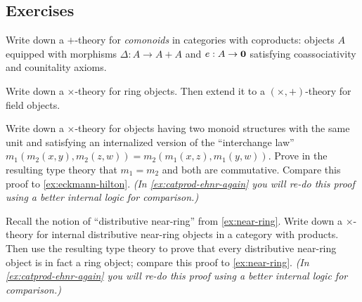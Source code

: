 \subsection*{Exercises}

\begin{ex}\label{ex:catcoprod-comon}
  Write down a $+$-theory for \emph{comonoids} in categories with coproducts: objects $A$ equipped with morphisms $\Delta:A\to A+A$ and $e:A\to \mathbf{0}$ satisfying coassociativity and counitality axioms.
\end{ex}

\begin{ex}\label{ex:catprodcoprod-field}
  Write down a $\times$-theory for ring objects.
  Then extend it to a $(\times,+)$-theory for field objects.
\end{ex}

\begin{ex}\label{ex:catprod-eckmann-hilton}
  Write down a $\times$-theory for objects having two monoid structures with the same unit and satisfying an internalized version of the ``interchange law'' $m_1(m_2(x,y),m_2(z,w)) = m_2(m_1(x,z),m_1(y,w))$.
  Prove in the resulting type theory that $m_1=m_2$ and both are commutative.
  Compare this proof to \cref{ex:eckmann-hilton}.
  \textit{(In \cref{ex:catprod-ehnr-again} you will re-do this proof using a better internal logic for comparison.)}
\end{ex}

\begin{ex}\label{ex:catprod-nearring}
  Recall the notion of ``distributive near-ring'' from \cref{ex:near-ring}.
  Write down a $\times$-theory for internal distributive near-ring objects in a category with products.
  Then use the resulting type theory to prove that every distributive near-ring object is in fact a ring object; compare this proof to \cref{ex:near-ring}.
  \textit{(In \cref{ex:catprod-ehnr-again} you will re-do this proof using a better internal logic for comparison.)}
\end{ex}


\ChapterExercises



